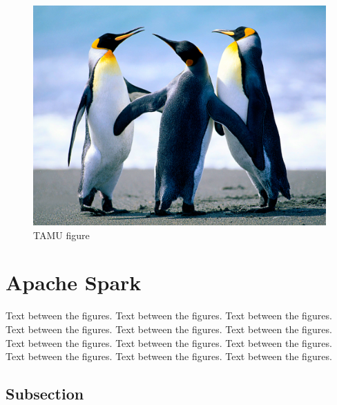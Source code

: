 \begin{figure}[H]
\centering
\includegraphics[scale=.50]{figures/Penguins.jpg}
\caption{TAMU figure}
\label{fig:tamu-fig3}
\end{figure}
\section{Apache Spark}

Text between the figures.  Text between the figures. Text between the figures. Text between the figures.  Text between the figures. Text between the figures. Text between the figures.  Text between the figures. Text between the figures. Text between the figures.  Text between the figures. Text between the figures.

\subsection{Subsection}

